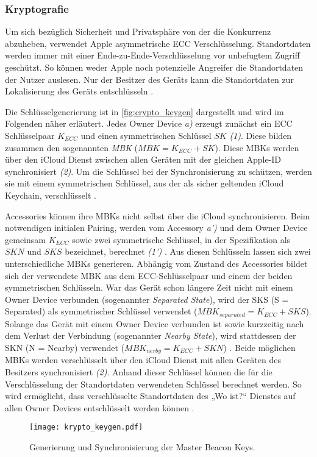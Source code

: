 \subsubsection{Kryptografie}
\label{sec:Kryptografie}

Um sich bezüglich Sicherheit und Privatsphäre von der die Konkurrenz abzuheben, verwendet Apple asymmetrische \ac{ECC} Verschlüsselung.
Standortdaten werden immer mit einer Ende-zu-Ende-Verschlüsselung vor unbefugtem Zugriff geschützt.
So können weder Apple noch potenzielle Angreifer die Standortdaten der Nutzer auslesen.
Nur der Besitzer des Geräts kann die Standortdaten zur Lokalisierung des Geräts entschlüsseln \cite{Greenberg_FindMyCrypto}.

Die Schlüsselgenerierung ist in \autoref{fig:crypto_keygen} dargestellt und wird im Folgenden näher erläutert.
Jedes Owner Device \textit{a)} erzeugt zunächst ein \ac{ECC} Schlüsselpaar $K_{ECC}$ und einen symmetrischen Schlüssel $SK$ \textit{(1)}.
Diese bilden zusammen den sogenannten \textit{\ac{MBK}} ($MBK = K_{ECC} + SK$).
Diese \acp{MBK} werden über den iCloud Dienst zwischen allen Geräten mit der gleichen Apple-ID synchronisiert \textit{(2)}.
Um die Schlüssel bei der Synchronisierung zu schützen, werden sie mit einem symmetrischen Schlüssel, aus der als sicher geltenden iCloud Keychain, verschlüsselt \cite{Heinrich_FindMy,Afonin_iCloudKeychain}.

   
Accessories können ihre \acp{MBK} nicht selbst über die iCloud synchronisieren.
Beim notwendigen initialen Pairing, werden vom Accessory \textit{a')} und dem Owner Device gemeinsam $K_{ECC}$ sowie zwei symmetrische Schlüssel, in der Spezifikation als $SKN$ und $SKS$ bezeichnet, berechnet \textit{(1')} \cite{Apple_FindMySpec}.
Aus diesen Schlüsseln lassen sich zwei unterschiedliche \acp{MBK} generieren.
Abhängig vom Zustand des Accessories bildet sich der verwendete \ac{MBK} aus dem \ac{ECC}-Schlüsselpaar und einem der beiden symmetrischen Schlüsseln.
War das Gerät schon längere Zeit nicht mit einem Owner Device verbunden (sogenannter \textit{Separated State}), wird der SKS (S = Separated) als symmetrischer Schlüssel verwendet ($MBK_{separated} = K_{ECC} + SKS$).
Solange das Gerät mit einem Owner Device verbunden ist sowie kurzzeitig nach dem Verlust der Verbindung (sogenannter \textit{Nearby State}), wird stattdessen der SKN (N = Nearby) verwendet ($MBK_{nerby} = K_{ECC} + SKN$) \cite{Apple_FindMySpec}.
Beide möglichen \acp{MBK} werden verschlüsselt über den iCloud Dienst mit allen Geräten des Besitzers synchronisiert \textit{(2)}.
Anhand dieser Schlüssel können die für die Verschlüsselung der Standortdaten verwendeten Schlüssel berechnet werden.
So wird ermöglicht, dass verschlüsselte Standortdaten des „Wo ist?“ Dienstes auf allen Owner Devices entschlüsselt werden können \cite{Heinrich_FindMy}.
\begin{figure}[ht]
    \centering
    \texttt{[image: krypto\_keygen.pdf]}
    \caption{Generierung und Synchronisierung der Master Beacon Keys.}
    \label{fig:crypto_keygen}
\end{figure}



